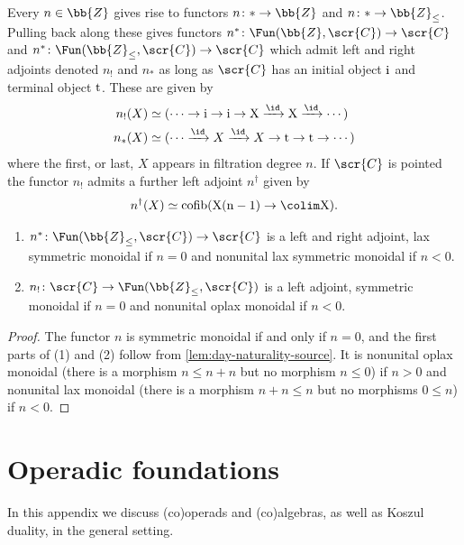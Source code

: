 \documentclass[a4paper]{amsart}
\begin{document}
\medskip

Every $n \in \bb{Z}$ gives rise to functors $n \colon \ast \to \bb{Z}$ and $n \colon \ast \to \bb{Z}_{\leq}$. Pulling back along these gives functors $n^* \colon \Fun(\bb{Z},\scr{C}) \to \scr{C}$ and $n^* \colon \Fun(\bb{Z}_{\leq},\scr{C}) \to \scr{C}$ which admit left and right adjoints denoted $n_!$ and $n_*$ as long as $\scr{C}$ has an initial object $\rm{i}$ and terminal object $\rm{t}$. These are given by
\begin{align*}n_!(X) &\simeq (\cdots \to \rm{i} \to \rm{i} \to X \xrightarrow{\id} X \xrightarrow{\id} \cdots ) \\
n_*(X) &\simeq (\cdots \xrightarrow{\id} X \xrightarrow{\id} X \to \rm{t} \to \rm{t} \to \cdots)\end{align*}
where the first, or last, $X$ appears in filtration degree $n$. If $\scr{C}$ is pointed the functor $n_!$ admits a further left adjoint $n^\dagger$ given by
\[n^\dagger(X) \simeq \rm{cofib}(X(n-1) \to \colim X).\]

\begin{lemma}\quad \label{lem:eval-lkan-sym-mon}
	\begin{enumerate}
		\item $n^* \colon \Fun(\bb{Z}_{\leq},\scr{C}) \to \scr{C}$ is a left and right adjoint, lax symmetric monoidal if $n=0$ and nonunital lax symmetric monoidal if $n < 0$.
		\item $n_! \colon \scr{C} \to \Fun(\bb{Z}_{\leq },\scr{C})$ is a left adjoint, symmetric monoidal if $n=0$ and nonunital oplax monoidal if $n < 0$.
	\end{enumerate}
\end{lemma}

\begin{proof}The functor $n$ is symmetric monoidal if and only if $n=0$, and the first parts of (1) and (2) follow from \cref{lem:day-naturality-source}. It is nonunital oplax monoidal (there is a morphism $n \leq n+n$ but no morphism $n \leq 0$) if $n>0$ and nonunital lax monoidal (there is a morphism $n+n \leq n$ but no morphisms $0 \leq n$) if $n<0$.
\end{proof}



\section{Operadic foundations} In this appendix we discuss (co)operads and (co)algebras, as well as Koszul duality, in the general setting.
\end{document}

